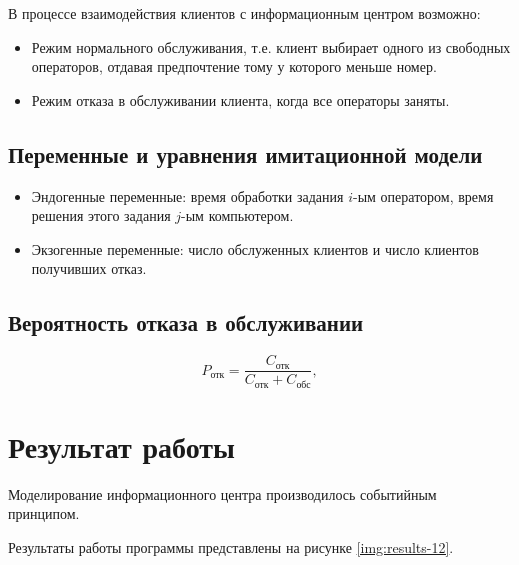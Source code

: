 \documentclass[a4paper,oneside,12pt]{extreport}
\begin{document}
В процессе взаимодействия клиентов с информационным центром возможно:
\begin{itemize}
	\item Режим нормального обслуживания, т.е. клиент выбирает одного из свободных операторов, отдавая предпочтение тому у которого меньше номер.
	\item Режим отказа в обслуживании клиента, когда все операторы заняты.
\end{itemize}

\section{Переменные и уравнения имитационной модели}

\begin{itemize}
	\item Эндогенные переменные: время обработки задания $i$-ым оператором, время решения этого задания $j$-ым компьютером.
	\item Экзогенные переменные: число обслуженных клиентов и число клиентов получивших отказ.
\end{itemize}

\section{Вероятность отказа в обслуживании}

\begin{equation}
	P_{\text{отк}} = \frac{C_{\text{отк}}}{C_{\text{отк}} + C_{\text{обс}}},
\end{equation}


\chapter{Результат работы}

Моделирование информационного центра производилось событийным принципом.

Результаты работы программы представлены на рисунке \ref{img:results-12}.
\end{document}
